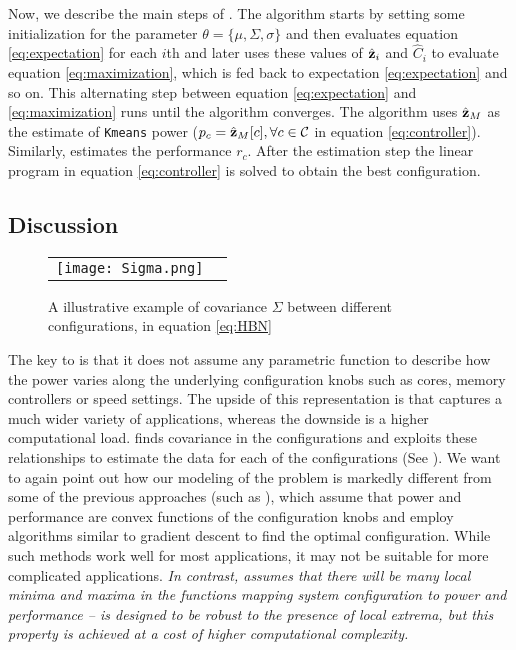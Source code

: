 Now, we describe the main steps of \SYSTEMLEO{}. The algorithm starts by
setting some initialization for the parameter $\theta = \{\mu, \Sigma,
\sigma\}$ and then evaluates equation \eqref{eq:expectation} for each
$i$th and later uses these values of $\hat{\mathbf{z}}_i$ and $\hat{C}_i$ to
evaluate equation \eqref{eq:maximization}, which is fed back to
expectation \eqref{eq:expectation} and so on. This alternating step
between equation \eqref{eq:expectation} and \eqref{eq:maximization}
runs until the algorithm converges. The algorithm uses $\hat{\mathbf{z}}_M$ as
the estimate of \texttt{Kmeans} power (\ie $p_c = \hat{\mathbf{z}}_M[c],
\forall c \in \mathcal{C}$ in equation \eqref{eq:controller}).
Similarly, \SYSTEMLEO{} estimates the performance $r_c$. After the
estimation step the linear program in equation \eqref{eq:controller}
is solved to obtain the best configuration.

\subsection{Discussion}

\begin{figure}
\begin{center}
\begin{tabular}[h]{cc}\hspace*{-15pt}
	 \texttt{[image: Sigma.png]}
\end{tabular}
\end{center}
\vspace{-1.46em}
\caption{A illustrative example of covariance $\Sigma$  between different configurations, in equation \eqref{eq:HBN}}
\label{fig:Sigma}
\end{figure}

The key to \SYSTEMLEO{} is that it does not assume any parametric
function to describe how the power varies along the underlying
configuration knobs such as cores, memory controllers or speed
settings. The upside of this representation is that \SYSTEMLEO{} captures
a much wider variety of applications, whereas the downside is a higher
computational load. \SYSTEMLEO{} finds covariance in the configurations
and exploits these relationships to estimate the data for each of the
configurations (See ). We want to again point out
how our modeling of the problem is markedly different from some of
the previous approaches (such as \cite{deng2012coscale}), which assume
that power and performance are convex functions of the configuration
knobs and employ algorithms similar to gradient descent to find the
optimal configuration. While such methods work well for most
applications, it may not be suitable for more complicated
applications. \emph{In contrast, \SYSTEMLEO{} assumes that there will be
  many local minima and maxima in the functions mapping system
  configuration to power and performance -- \SYSTEMLEO{} is designed to be
  robust to the presence of local extrema, but this property is achieved at a cost of
  higher computational complexity.}

